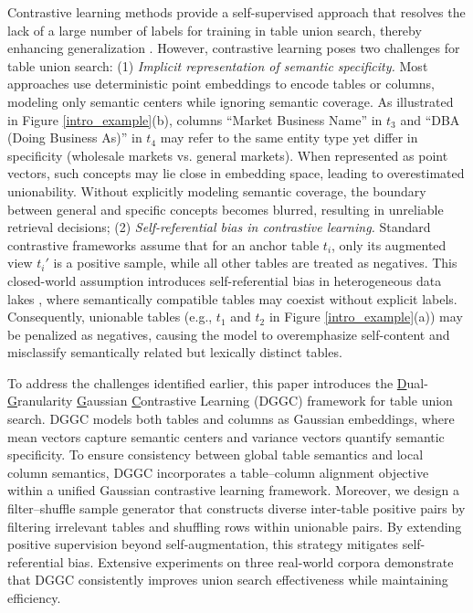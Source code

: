 Contrastive learning methods provide a self-supervised approach that resolves the lack of a large number of labels for training in table union search, thereby enhancing generalization \cite{fan2022semantics}. However, contrastive learning poses two challenges for table union search: (1) \textit{Implicit representation of semantic specificity.} Most approaches use deterministic point embeddings to encode tables or columns, modeling only semantic centers while ignoring semantic coverage. As illustrated in Figure \ref{intro_example}(b), columns {``Market Business Name''} in $t_3$ and {``DBA (Doing Business As)''} in $t_4$ may refer to the same entity type yet differ in specificity (wholesale markets vs. general markets). When represented as point vectors, such concepts may lie close in embedding space, leading to overestimated unionability. Without explicitly modeling semantic coverage, the boundary between general and specific concepts becomes blurred, resulting in unreliable retrieval decisions; (2) \textit{Self-referential bias in contrastive learning.} Standard contrastive frameworks assume that for an anchor table $t_i$, only its augmented view $t_i'$ is a positive sample, while all other tables are treated as negatives. This closed-world assumption introduces self-referential bias in heterogeneous data lakes \cite{boutaleb2025something}, where semantically compatible tables may coexist without explicit labels. Consequently, unionable tables (e.g., $t_1$ and $t_2$ in Figure \ref{intro_example}(a)) may be penalized as negatives, causing the model to overemphasize self-content and misclassify semantically related but lexically distinct tables.

To address the challenges identified earlier, this paper introduces the \underline{D}ual-\underline{G}ranularity \underline{G}aussian \underline{C}ontrastive Learning (DGGC) framework for table union search. DGGC models both tables and columns as Gaussian embeddings, where mean vectors capture semantic centers and variance vectors quantify semantic specificity. To ensure consistency between global table semantics and local column semantics, DGGC incorporates a table–column alignment objective within a unified Gaussian contrastive learning framework. 
Moreover, we design a filter–shuffle sample generator that constructs diverse inter-table positive pairs by filtering irrelevant tables and shuffling rows within unionable pairs. By extending positive supervision beyond self-augmentation, this strategy mitigates self-referential bias. Extensive experiments on three real-world corpora demonstrate that DGGC consistently improves union search effectiveness while maintaining efficiency.

